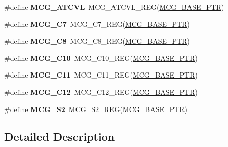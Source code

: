 \begin{DoxyCompactItemize}
\item 
\hypertarget{group___m_c_g___register___accessor___macros_ga4999439546569874f8c31b012637d15f}{}\#define {\bfseries M\+C\+G\+\_\+\+A\+T\+C\+V\+L}~M\+C\+G\+\_\+\+A\+T\+C\+V\+L\+\_\+\+R\+E\+G(\hyperlink{group___m_c_g___peripheral_gaceefc72e93a47a35f59a31c57dddf41b}{M\+C\+G\+\_\+\+B\+A\+S\+E\+\_\+\+P\+T\+R})\label{group___m_c_g___register___accessor___macros_ga4999439546569874f8c31b012637d15f}

\item 
\hypertarget{group___m_c_g___register___accessor___macros_ga9fc6058dcffc6506763ff7235669038c}{}\#define {\bfseries M\+C\+G\+\_\+\+C7}~M\+C\+G\+\_\+\+C7\+\_\+\+R\+E\+G(\hyperlink{group___m_c_g___peripheral_gaceefc72e93a47a35f59a31c57dddf41b}{M\+C\+G\+\_\+\+B\+A\+S\+E\+\_\+\+P\+T\+R})\label{group___m_c_g___register___accessor___macros_ga9fc6058dcffc6506763ff7235669038c}

\item 
\hypertarget{group___m_c_g___register___accessor___macros_ga4328cf0c21c1c85cc0d618f7762016b8}{}\#define {\bfseries M\+C\+G\+\_\+\+C8}~M\+C\+G\+\_\+\+C8\+\_\+\+R\+E\+G(\hyperlink{group___m_c_g___peripheral_gaceefc72e93a47a35f59a31c57dddf41b}{M\+C\+G\+\_\+\+B\+A\+S\+E\+\_\+\+P\+T\+R})\label{group___m_c_g___register___accessor___macros_ga4328cf0c21c1c85cc0d618f7762016b8}

\item 
\hypertarget{group___m_c_g___register___accessor___macros_gab582a1281f6376c0dd52e62c3e22653e}{}\#define {\bfseries M\+C\+G\+\_\+\+C10}~M\+C\+G\+\_\+\+C10\+\_\+\+R\+E\+G(\hyperlink{group___m_c_g___peripheral_gaceefc72e93a47a35f59a31c57dddf41b}{M\+C\+G\+\_\+\+B\+A\+S\+E\+\_\+\+P\+T\+R})\label{group___m_c_g___register___accessor___macros_gab582a1281f6376c0dd52e62c3e22653e}

\item 
\hypertarget{group___m_c_g___register___accessor___macros_ga7dfa9cc2dfc2582045cab4b5e985e84f}{}\#define {\bfseries M\+C\+G\+\_\+\+C11}~M\+C\+G\+\_\+\+C11\+\_\+\+R\+E\+G(\hyperlink{group___m_c_g___peripheral_gaceefc72e93a47a35f59a31c57dddf41b}{M\+C\+G\+\_\+\+B\+A\+S\+E\+\_\+\+P\+T\+R})\label{group___m_c_g___register___accessor___macros_ga7dfa9cc2dfc2582045cab4b5e985e84f}

\item 
\hypertarget{group___m_c_g___register___accessor___macros_ga3f2356d4e0baabff8c3d086861295ea1}{}\#define {\bfseries M\+C\+G\+\_\+\+C12}~M\+C\+G\+\_\+\+C12\+\_\+\+R\+E\+G(\hyperlink{group___m_c_g___peripheral_gaceefc72e93a47a35f59a31c57dddf41b}{M\+C\+G\+\_\+\+B\+A\+S\+E\+\_\+\+P\+T\+R})\label{group___m_c_g___register___accessor___macros_ga3f2356d4e0baabff8c3d086861295ea1}

\item 
\hypertarget{group___m_c_g___register___accessor___macros_gafedfbd5a1888b40c01abd18677752b34}{}\#define {\bfseries M\+C\+G\+\_\+\+S2}~M\+C\+G\+\_\+\+S2\+\_\+\+R\+E\+G(\hyperlink{group___m_c_g___peripheral_gaceefc72e93a47a35f59a31c57dddf41b}{M\+C\+G\+\_\+\+B\+A\+S\+E\+\_\+\+P\+T\+R})\label{group___m_c_g___register___accessor___macros_gafedfbd5a1888b40c01abd18677752b34}

\end{DoxyCompactItemize}


\subsection{Detailed Description}

